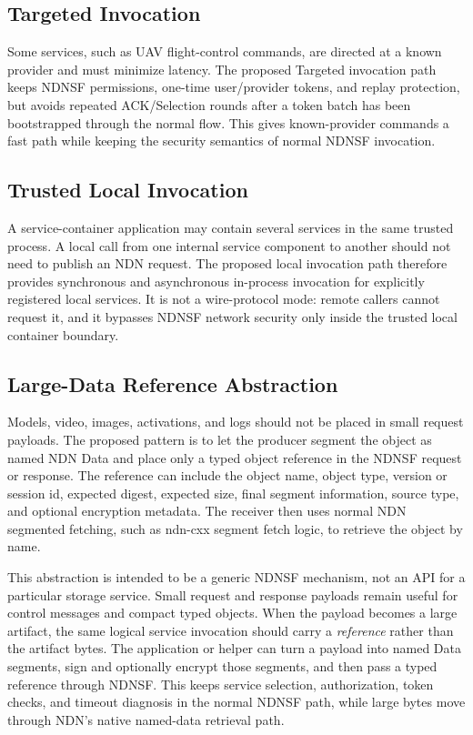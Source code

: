 \subsection{Targeted Invocation}

Some services, such as UAV flight-control commands, are directed at a known
provider and must minimize latency. The proposed Targeted invocation path keeps
NDNSF permissions, one-time user/provider tokens, and replay protection, but
avoids repeated ACK/Selection rounds after a token batch has been bootstrapped
through the normal flow. This gives known-provider commands a fast path while
keeping the security semantics of normal NDNSF invocation.

\subsection{Trusted Local Invocation}

A service-container application may contain several services in the same
trusted process. A local call from one internal service component to another
should not need to publish an NDN request. The proposed local invocation path
therefore provides synchronous and asynchronous in-process invocation for
explicitly registered local services. It is not a wire-protocol mode: remote
callers cannot request it, and it bypasses NDNSF network security only inside
the trusted local container boundary.

\subsection{Large-Data Reference Abstraction}

Models, video, images, activations, and logs should not be placed in small
request payloads. The proposed pattern is to let the producer segment the
object as named NDN Data and place only a typed object reference in the NDNSF
request or response. The reference can include the object name, object type,
version or session id, expected digest, expected size, final segment
information, source type, and optional encryption metadata. The receiver then
uses normal NDN segmented fetching, such as ndn-cxx segment fetch logic, to
retrieve the object by name.

This abstraction is intended to be a generic NDNSF mechanism, not an API for a
particular storage service. Small request and response payloads remain useful
for control messages and compact typed objects. When the payload becomes a
large artifact, the same logical service invocation should carry a
\emph{reference} rather than the artifact bytes. The application or helper can
turn a payload into named Data segments, sign and optionally encrypt those
segments, and then pass a typed reference through NDNSF. This keeps service
selection, authorization, token checks, and timeout diagnosis in the normal
NDNSF path, while large bytes move through NDN's native named-data retrieval
path.


